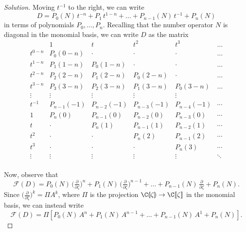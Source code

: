 \documentclass{article}
\theoremstyle{definition}
\theoremstyle{plain}
\newcommand{\dict}{\mathcal{F}}
\begin{document}
\begin{proof}[Solution]
Moving $t^{-1}$ to the right, we can write
\[ D = P_0(N)\,t^{-n} + P_1\,t^{1-n} + \ldots + P_{n-1}(N)\,t^{-1} + P_n(N) \]
in terms of polynomials $P_0, \ldots, P_n$. Recalling that the number operator $N$ is diagonal in the monomial basis, we can write $D$ as the matrix
\[ \begin{array}{l|lllll}
& 1 & t & t^2 & t^3 & \ldots \\ \hline
t^{0-n} & P_0(0-n) & \cdot & \cdot & \cdot & \ldots \\
t^{1-n} & P_1(1-n) & P_0(1-n) & \cdot & \cdot & \ldots \\
t^{2-n} & P_2(2-n) & P_1(2-n) & P_0(2-n) & \cdot & \ldots \\
t^{3-n} & P_3(3-n) & P_2(3-n) & P_1(3-n) & P_0(3-n) & \ldots \\
\vdots & \vdots & \vdots & \vdots & \vdots \\
t^{-1} & P_{n-1}(-1) & P_{n-2}(-1) & P_{n-3}(-1) & P_{n-4}(-1) & \cdots \\
1 & P_n(0) & P_{n-1}(0) & P_{n-2}(0) & P_{n-3}(0) & \cdots \\
t & \cdot & P_n(1) & P_{n-1}(1) & P_{n-2}(1) & \cdots \\
t^2 & \cdot & \cdot & P_n(2) & P_{n-1}(2) & \cdots \\
t^3 & \cdot & \cdot & \cdot & P_n(3) & \cdots \\
\vdots & \vdots & \vdots & \vdots & \vdots & \ddots \\
\end{array} \]

Now, observe that
\[ \dict(D) = P_0(N)\,\big(\tfrac{\partial}{\partial \zeta}\big)^n + P_1(N)\,\big(\tfrac{\partial}{\partial \zeta}\big)^{n-1} + \ldots + P_{n-1}(N)\,\tfrac{\partial}{\partial \zeta} + P_n(N). \]
Since $\big(\tfrac{\partial}{\partial \zeta}\big)^k = \Pi A^k$, where $\Pi$ is the projection $\C\llparenthesis \zeta \rrparenthesis \to \C\llbracket \zeta \rrbracket$ in the monomial basis, we can instead write
\[ \dict(D) = \Pi \left[ P_0(N)\,A^n + P_1(N)\,A^{n-1} + \ldots + P_{n-1}(N)\,A^1 + P_n(N) \right]. \]
\end{proof}
\end{document}

